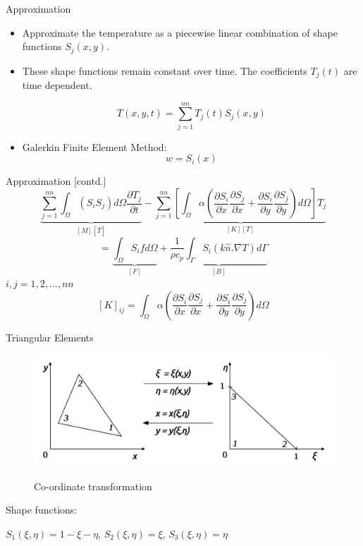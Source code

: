 \documentclass[t,english]{beamer}
\begin{document}
\begin{frame}[c]{Approximation}
\begin{itemize}

\item Approximate the temperature as a piecewise linear combination of shape functions $S_j(x,y)$. 
\item These shape functions remain constant over time. The coefficients $T_j(t)$ are time dependent.

 $${ T }(x,y,t)=\sum _{ j=1 }^{ nn }{ { T }_{ j }(t){ S }_{ j }(x,y) } $$

\item Galerkin Finite Element Method: $$w=S_i(x)$$
\end{itemize}
\end{frame}

\begin{frame}[c]{Approximation [contd.]}
$$\underbrace{\sum_{j=1}^{nn} \int_\Omega (S_i S_j)d\Omega \frac{\partial T_j}{\partial t}}_{[M][\dot{T}]} - \underbrace{\sum_{j=1}^{nn}[\int_\Omega \alpha (\frac{\partial S_i}{\partial x}\frac{\partial S_j}{\partial x} + \frac{\partial S_i}{\partial y}\frac{\partial S_j}{\partial y})d\Omega] T_j }_{[K][T]}$$ $$= \underbrace{\int_\Omega S_i	f d\Omega}_{[F]}  +  \underbrace{\frac{1}{\rho c_p} \int_\Gamma S_i (k \hat{n}.\nabla T) d\Gamma}_{[B]}$$
$i,j = 1,2,...,nn	 $
$$[K]_{ij} = \int_\Omega \alpha (\frac{\partial S_i}{\partial x}\frac{\partial S_j}{\partial x} + \frac{\partial S_i}{\partial y}\frac{\partial S_j}{\partial y})d\Omega$$
\end{frame}

\begin{frame}[c]{Triangular Elements}
\begin{figure}
\centering
\includegraphics[scale=0.2]{master_elem.png}

Co-ordinate transformation
\end{figure}
Shape functions:

$S_1(\xi,\eta) = 1 - \xi - \eta$,  $S_2(\xi,\eta) = \xi$, $S_3(\xi,\eta) = \eta$
\end{frame}
\end{document}
